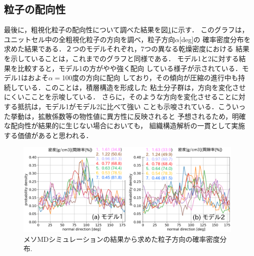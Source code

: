 \subsection{粒子の配向性}
最後に，粗視化粒子の配向性について調べた結果を図\ref{fig:fig9}に示す．
このグラフは，ユニットセル中の全粗視化粒子の方向を調べ，粒子方向$\alpha$[deg]の
確率密度分布を求めた結果である．２つのモデルそれぞれ，7つの異なる乾燥密度における
結果を示していることは，これまでのグラフと同様である．
モデル1と2に対する結果を比較すると，モデル1の方がやや強く配向
している様子が示されている．モデル1はおよそ$\alpha=$100度の方向に配向
しており，その傾向が圧縮の進行中も持続している．このことは，積層構造を形成した
粘土分子群は，方向を変化させにくいこことを示唆している．
さらに，そのような方向を変化させることに対する抵抗は，モデル1がモデル2に比べて強い
ことも示唆されている．こういった挙動は，拡散係数等の物性値に異方性に反映されると
予想されるため，明確な配向性が結果的に生じない場合においても，
組織構造解析の一貫として実施する価値があると思われる．
\begin{figure}[h]
	\begin{center}
	\includegraphics[width=1.0\linewidth]{Figs/fig9.eps} 
	\end{center}
	\caption{
		メソMDシミュレーションの結果から求めた粒子方向の確率密度分布.
	} 
	\label{fig:fig9}
\end{figure}
